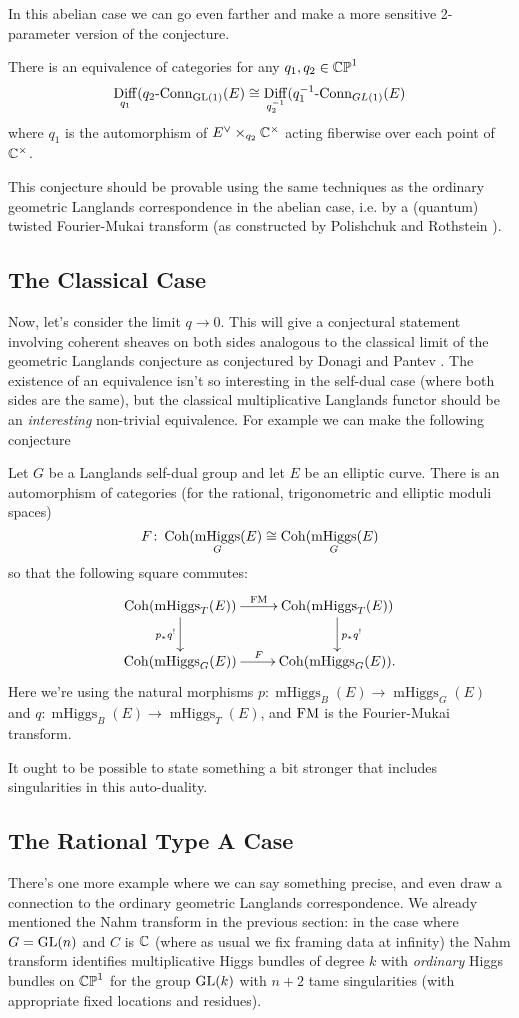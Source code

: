 \documentclass[10pt, oneside]{article}
\DeclareMathOperator{\mhiggs}{mHiggs}
\renewcommand{\conn}{\text{-Conn}}
\DeclareMathOperator{\diff}{Diff}
\begin{document}
In this abelian case we can go even farther and make a more sensitive 2-parameter version of the conjecture.

\begin{conjecture}
There is an equivalence of categories for any $q_1, q_2 \in \mathbb{CP}^1$
\[\diff_{q_1}(q_2\conn_{\GL(1)}(E) \iso \diff_{q_2^{-1}}(q_1^{-1}\conn_{GL(1)}(E)\]
where $q_1$ is the automorphism of $E^\vee \times_{q_2} \mathbb{C}^\times$ acting fiberwise over each point of $\mathbb{C}^\times$.
\end{conjecture}

This conjecture should be provable using the same techniques as the ordinary geometric Langlands correspondence in the abelian case, i.e. by a (quantum) twisted Fourier-Mukai transform (as constructed by Polishchuk and Rothstein \cite{PolishchukRothstein}).

\subsection{The Classical Case}
Now, let's consider the limit $q \to 0$.  This will give a conjectural statement involving coherent sheaves on both sides analogous to the classical limit of the geometric Langlands conjecture as conjectured by Donagi and Pantev \cite{DonagiPantev}.  The existence of an equivalence isn't so interesting in the self-dual case (where both sides are the same), but the classical multiplicative Langlands functor should be an \emph{interesting} non-trivial equivalence.  For example we can make the following conjecture

\begin{conjecture}
Let $G$ be a Langlands self-dual group and let $E$ be an elliptic curve.  There is an automorphism of categories (for the rational, trigonometric and elliptic moduli spaces)
\[F \colon \coh(\mhiggs_G(E) \iso \coh(\mhiggs_{G}(E)\]
so that the following square commutes:
\[\xymatrix{
\coh(\mhiggs_T(E)) \ar[r]^{\mathrm{FM}} \ar[d]_{p_*q^!} &\coh(\mhiggs_T(E)) \ar[d]^{p_*q^!} \\
\coh(\mhiggs_G(E)) \ar[r]^{F} &\coh(\mhiggs_G(E)).
}\]
Here we're using the natural morphisms $p \colon \mhiggs_B(E) \to \mhiggs_G(E)$ and $q \colon \mhiggs_B(E) \to \mhiggs_T(E)$, and $\mathrm{FM}$ is the Fourier-Mukai transform.
\end{conjecture}

It ought to be possible to state something a bit stronger that includes singularities in this auto-duality.

\subsection{The Rational Type A Case}
There's one more example where we can say something precise, and even draw a connection to the ordinary geometric Langlands correspondence.  We already mentioned the Nahm transform in the previous section: in the case where $G = \mathrm{GL}(n)$ and $C$ is $\mathbb{C}$ (where as usual we fix framing data at infinity) the Nahm transform identifies multiplicative Higgs bundles of degree $k$ with \emph{ordinary} Higgs bundles on $\mathbb{CP}^1$ for the group $\mathrm{GL}(k)$ with $n+2$ tame singularities (with appropriate fixed locations and residues).
\end{document}
